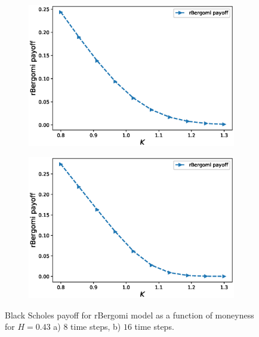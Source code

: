 \documentclass[11pt]{article}
\begin{document}
\begin{figure}[!h]
	\centering
	\begin{subfigure}{.5\textwidth}
		\centering
		\includegraphics[width=0.95\linewidth]{./figures/payoff_plots_H_043/rBergomi_payoff_8steps_wrt_monyeness_2_H043}
		\caption{}
		\label{fig:rBergomi_payoff_4steps_wrt_monyeness_043_sub3}
	\end{subfigure}%
	\begin{subfigure}{.5\textwidth}
		\centering
		\includegraphics[width=0.95\linewidth]{./figures/payoff_plots_H_043/rBergomi_payoff_16steps_wrt_monyeness_2_H043}
		\caption{ }
		\label{fig:rBergomi_payoff_4steps_wrt_monyeness_043_sub4}
	\end{subfigure}%
	\caption{Black Scholes payoff for rBergomi model as a function of moneyness for $H=0.43$ a) $8$  time steps, b) $16$  time steps.}
	\label{fig:rBergomi_payoff_4steps_wrt_monyeness_H_043_2}
\end{figure}
\end{document}
